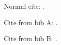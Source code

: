 \documentclass{article}
\begin{document}
Normal cite: \cite{ref}.



Cite from bib A: .

Cite from bib B: .
\end{document}
